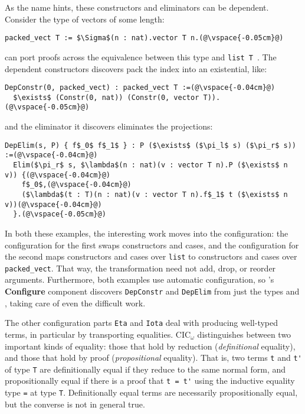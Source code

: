 As the name hints, these constructors and eliminators can be dependent.
Consider the type of vectors of some length:

\begin{lstlisting}
packed_vect T := $\Sigma$(n : nat).vector T n.(@\vspace{-0.05cm}@)
\end{lstlisting}
\toolname can port proofs across the equivalence between this type and \lstinline{list T}~\href{https://github.com/uwplse/pumpkin-pi/blob/v2.0.0/plugin/coq/examples/Example.v}{}. %
The dependent constructors \toolname discovers pack the index into an existential, like:

\begin{lstlisting}
DepConstr(0, packed_vect) : packed_vect T :=(@\vspace{-0.04cm}@)
  $\exists$ (Constr(0, nat)) (Constr(0, vector T)).(@\vspace{-0.05cm}@)
\end{lstlisting}
and the eliminator it discovers eliminates the projections:

\begin{lstlisting}
DepElim(s, P) { f$_0$ f$_1$ } : P ($\exists$ ($\pi_l$ s) ($\pi_r$ s)) :=(@\vspace{-0.04cm}@)
  Elim($\pi_r$ s, $\lambda$(n : nat)(v : vector T n).P ($\exists$ n v)) {(@\vspace{-0.04cm}@)
    f$_0$,(@\vspace{-0.04cm}@)
    ($\lambda$(t : T)(n : nat)(v : vector T n).f$_1$ t ($\exists$ n v))(@\vspace{-0.04cm}@)
  }.(@\vspace{-0.05cm}@) 
\end{lstlisting}

In both these examples, the interesting work moves into the configuration:
the configuration for the first swaps constructors and cases,
and the configuration for the second maps constructors and cases over \lstinline{list} to constructors and cases over \lstinline{packed_vect}. %
That way, the transformation need not add, drop, or reorder arguments.
Furthermore, both examples use automatic configuration, so \toolname's \textbf{Configure} component 
discovers \lstinline{DepConstr} and \lstinline{DepElim} from just the types \A and \B, taking care of even the difficult work.

The other configuration parts \lstinline{Eta} and \lstinline{Iota} deal with producing well-typed terms,
in particular by transporting equalities.
CIC$_{\omega}$ distinguishes between two important kinds of equality: those that hold by reduction (\textit{definitional} equality), and those that hold by proof (\textit{propositional} equality).
That is, two terms \lstinline{t} and \lstinline{t'} of type \lstinline{T} are definitionally equal if they reduce to the same normal form,
and propositionally equal if there is a proof that \lstinline{t = t'} using the inductive
equality type \lstinline{=} at type \lstinline{T}. Definitionally equal terms are necessarily propositionally equal, but 
the converse is not in general true.

